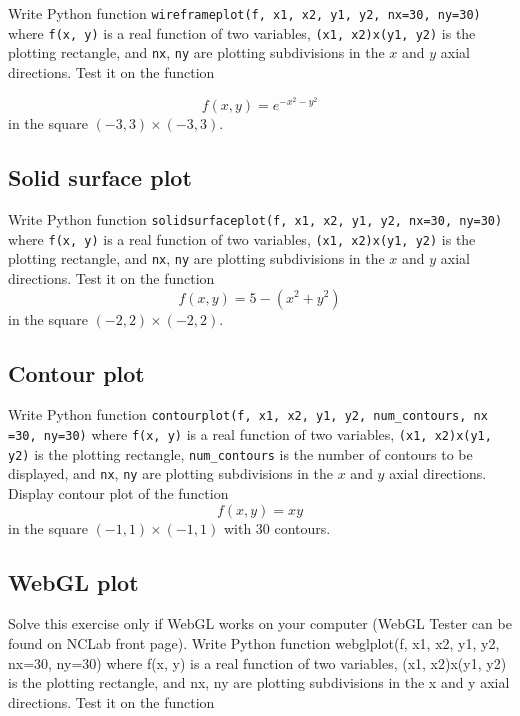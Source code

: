 Write Python function {\tt wireframeplot(f, x1, x2, y1, y2, nx=30, ny=30)} where {\tt f(x, y)} is a real function 
of two variables, {\tt (x1, x2)x(y1, y2)} is the plotting rectangle, and {\tt nx}, {\tt ny} are plotting 
subdivisions in the $x$ and $y$ axial directions. Test it on the function 

$$
f(x, y) = e^{-x^2 - y^2}
$$
in the square $(-3, 3)\times (-3, 3)$.


\subsection{Solid surface plot}

Write Python function {\tt solidsurfaceplot(f, x1, x2, y1, y2, nx=30, ny=30)} where {\tt f(x, y)} is a real function 
of two variables, {\tt (x1, x2)x(y1, y2)} is the plotting rectangle, and {\tt nx}, {\tt ny} are plotting 
subdivisions in the $x$ and $y$ axial directions. Test it on the function 
$$
f(x, y) = 5 - (x^2 + y^2)
$$
in the square $(-2, 2)\times (-2, 2)$.


\subsection{Contour plot}

Write Python function {\tt contourplot(f, x1, x2, y1, y2, num\_contours, 
nx =30, ny=30)} where {\tt f(x, y)} is a real function 
of two variables, {\tt (x1, x2)x(y1, y2)} is the plotting rectangle, {\tt num\_contours}
is the number of contours to be displayed, and {\tt nx}, {\tt ny} are plotting 
subdivisions in the $x$ and $y$ axial directions. Display contour plot of the function 
$$
f(x, y) = xy 
$$
in the square $(-1, 1)\times (-1, 1)$ with 30 contours.


\subsection{WebGL plot}

Solve this exercise only if WebGL works on your 
computer (WebGL Tester can be found on NCLab 
front page). Write Python function webglplot(f, x1, x2, y1, y2, nx=30, ny=30) where 
f(x, y) is a real function of two variables, (x1, x2)x(y1, y2) is the plotting 
rectangle, and nx, ny are plotting subdivisions in the x and y axial directions. 
Test it on the function

